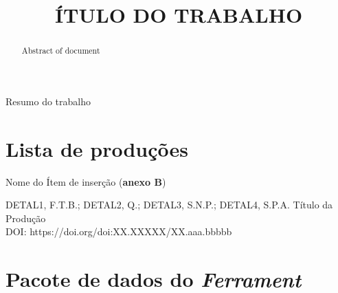 \documentclass[openright]{normas-utf-tex} %
\title{ÍTULO DO TRABALHO} %
\begin{document}
\capa 
\folhaderosto 

\begin{resumo}
Resumo do trabalho
\end{resumo}

\begin{abstract}
Abstract of document
\end{abstract}

\listadefiguras %
\listadesiglas %
\printnomenclature %


\sumario %






 

\clearpage %
\label{bibstart}
\label{bibend}


\anexo

\chapter{Lista de produções}

\begin{enumerate}
\begin{large}
\item Nome do Ítem de inserção (\textbf{anexo B})
\end{large}

DETAL1, F.T.B.; DETAL2, Q.; DETAL3, S.N.P.; DETAL4, S.P.A.
Título da Produção \\
DOI: https://doi.org/doi:XX.XXXXX/XX.aaa.bbbbb

\end{enumerate}

\chapter{Pacote de dados do \textit{Ferrament}}
\end{document}
